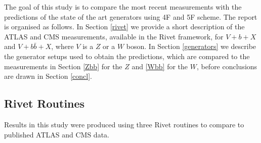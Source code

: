 \documentclass[11pt]{cernrep} \usepackage{graphicx,epsfig} 
\begin{document}
The goal of this study is to compare the most recent measurements with the predictions of the state of the art
generators using 4F and 5F scheme. The report is organised as follows. In Section \ref{rivet} we provide a short
description of the ATLAS and CMS measurements, available in the Rivet framework, for $V+b+X$ and $V+b\bar{b}+X$, where $V$ is a $Z$ or a $W$ boson.
 In Section \ref{generators} we describe the generator setups used to obtain the
predictions, which are compared to the measurements in Section \ref{Zbb} for the $Z$ and \ref{Wbb} for the $W$, before
conclusions are drawn in Section \ref{concl}.   


\subsection{Rivet Routines \label{rivet}}

Results in this study were produced using three Rivet routines to compare to published ATLAS and CMS data.
\end{document}
